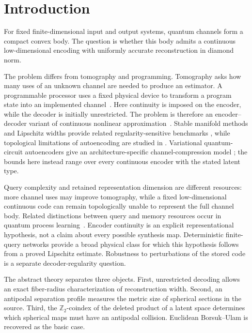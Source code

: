 \documentclass[11pt,a4paper]{article}
\theoremstyle{definition}
\theoremstyle{plain}
\theoremstyle{remark}
\begin{document}
\section{Introduction}

For fixed finite-dimensional input and output systems, quantum channels form
a compact convex body. The question is whether this body admits a continuous
low-dimensional encoding with uniformly accurate reconstruction in diamond
norm.

The problem differs from tomography and programming. Tomography asks how
many uses of an unknown channel are needed to produce an estimator. A
programmable processor uses a fixed physical device to transform a program
state into an implemented channel~\cite{NielsenChuang1997}. Here continuity
is imposed on the encoder, while the decoder is initially unrestricted. The
problem is therefore an encoder--decoder variant of continuous nonlinear
approximation~\cite{DeVoreHowardMicchelli1989}. Stable manifold methods and
Lipschitz widths provide related regularity-sensitive benchmarks
\cite{CohenEtAl2022,PetrovaWojtaszczyk2023}, while topological limitations of
autoencoding are studied in
\cite{BatsonEtAl2021,KvalheimSontag2024}. Variational quantum-circuit
autoencoders give an architecture-specific channel-compression model
\cite{WuEtAl2024}; the bounds here instead range over every continuous encoder
with the stated latent type.

Query complexity and retained representation dimension are different
resources: more channel uses may improve tomography, while a fixed
low-dimensional continuous code can remain topologically unable to represent
the full channel body. Related distinctions between query and memory
resources occur in quantum process learning~\cite{Caro2024}. Encoder
continuity is an explicit representational hypothesis, not a claim about
every possible synthesis map. Deterministic finite-query networks provide a
broad physical class for which this hypothesis follows from a proved
Lipschitz estimate. Robustness to perturbations of the stored code is a
separate decoder-regularity question.

The abstract theory separates three objects. First, unrestricted decoding
allows an exact fiber-radius characterization of reconstruction width.
Second, an antipodal separation profile measures the metric size of spherical
sections in the source. Third, the $\mathbb Z_2$-coindex of the deleted
product of a latent space determines which spherical maps must have an
antipodal collision. Euclidean Borsuk--Ulam is recovered as the basic case.
\end{document}
